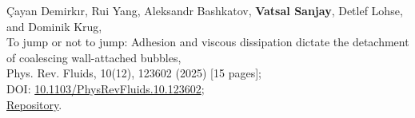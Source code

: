 	\item Çayan Demirkır, Rui Yang, Aleksandr Bashkatov, \textbf{Vatsal Sanjay}, Detlef Lohse, and Dominik Krug,\\
	To jump or not to jump: Adhesion and viscous dissipation dictate the detachment of coalescing wall-attached bubbles,\\
	Phys. Rev. Fluids, 10(12), 123602 (2025) [15 pages];\\
	\faFile\hspace{0.2em}DOI: \href{https://doi.org/10.1103/PhysRevFluids.10.123602}{10.1103/PhysRevFluids.10.123602};\\
	\faGithub\hspace{0.2em}\href{https://github.com/VatsalSy/jumping-bubbles}{Repository}.

